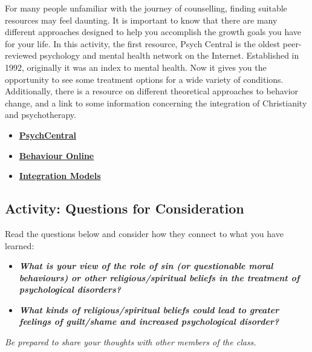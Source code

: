 \documentclass[
]{book}
\providecommand{\tightlist}{%
  \setlength{\itemsep}{0pt}\setlength{\parskip}{0pt}}
\begin{document}
\begin{reflect}
For many people unfamiliar with the journey of counselling, finding suitable resources may feel daunting. It is important to know that there are many different approaches designed to help you accomplish the growth goals you have for your life. In this activity, the first resource, Psych Central is the oldest peer-reviewed psychology and mental health network on the Internet. Established in 1992, originally it was an index to mental health. Now it gives you the opportunity to see some treatment options for a wide variety of conditions. Additionally, there is a resource on different theoretical approaches to behavior change, and a link to some information concerning the integration of Christianity and psychotherapy.

\begin{itemize}
\tightlist
\item
  \href{https://psychcentral.com/}{\textbf{PsychCentral}}\\
\item
  \href{http://www.behavior.net}{\textbf{Behaviour Online}}\\
\item
  \href{http://www.psyche.gr/lpsycrel.htm}{\textbf{Integration Models}}
\end{itemize}
\end{reflect}

\hypertarget{activity-questions-for-consideration-20}{%
\subsection*{Activity: Questions for Consideration}\label{activity-questions-for-consideration-20}}

\begin{reflect}
Read the questions below and consider how they connect to what you have learned:

\begin{itemize}
\tightlist
\item
  \textbf{\emph{What is your view of the role of sin (or questionable moral behaviours) or other religious/spiritual beliefs in the treatment of psychological disorders?}}\\
\item
  \textbf{\emph{What kinds of religious/spiritual beliefs could lead to greater feelings of guilt/shame and increased psychological disorder?}}
\end{itemize}

\emph{Be prepared to share your thoughts with other members of the class.}
\end{reflect}
\end{document}
